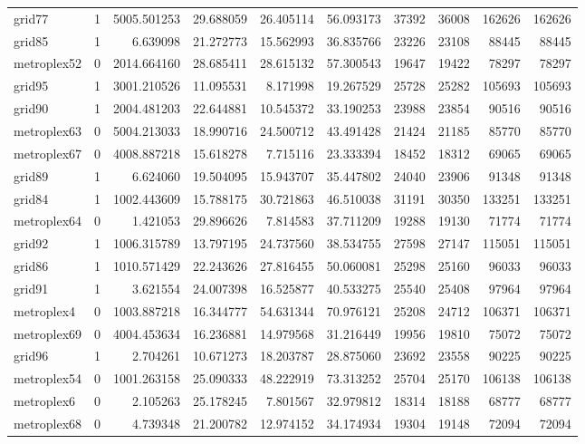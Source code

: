 \begin{longtable}{|l|r|r|r|r|r|r|r|r|r|}
grid77 & 1 & 5005.501253 & 29.688059 & 26.405114 & 56.093173 & 37392 & 36008 & 162626 & 162626 \\
grid85 & 1 & 6.639098 & 21.272773 & 15.562993 & 36.835766 & 23226 & 23108 & 88445 & 88445 \\
metroplex52 & 0 & 2014.664160 & 28.685411 & 28.615132 & 57.300543 & 19647 & 19422 & 78297 & 78297 \\
grid95 & 1 & 3001.210526 & 11.095531 & 8.171998 & 19.267529 & 25728 & 25282 & 105693 & 105693 \\
grid90 & 1 & 2004.481203 & 22.644881 & 10.545372 & 33.190253 & 23988 & 23854 & 90516 & 90516 \\
metroplex63 & 0 & 5004.213033 & 18.990716 & 24.500712 & 43.491428 & 21424 & 21185 & 85770 & 85770 \\
metroplex67 & 0 & 4008.887218 & 15.618278 & 7.715116 & 23.333394 & 18452 & 18312 & 69065 & 69065 \\
grid89 & 1 & 6.624060 & 19.504095 & 15.943707 & 35.447802 & 24040 & 23906 & 91348 & 91348 \\
grid84 & 1 & 1002.443609 & 15.788175 & 30.721863 & 46.510038 & 31191 & 30350 & 133251 & 133251 \\
metroplex64 & 0 & 1.421053 & 29.896626 & 7.814583 & 37.711209 & 19288 & 19130 & 71774 & 71774 \\
grid92 & 1 & 1006.315789 & 13.797195 & 24.737560 & 38.534755 & 27598 & 27147 & 115051 & 115051 \\
grid86 & 1 & 1010.571429 & 22.243626 & 27.816455 & 50.060081 & 25298 & 25160 & 96033 & 96033 \\
grid91 & 1 & 3.621554 & 24.007398 & 16.525877 & 40.533275 & 25540 & 25408 & 97964 & 97964 \\
metroplex4 & 0 & 1003.887218 & 16.344777 & 54.631344 & 70.976121 & 25208 & 24712 & 106371 & 106371 \\
metroplex69 & 0 & 4004.453634 & 16.236881 & 14.979568 & 31.216449 & 19956 & 19810 & 75072 & 75072 \\
grid96 & 1 & 2.704261 & 10.671273 & 18.203787 & 28.875060 & 23692 & 23558 & 90225 & 90225 \\
metroplex54 & 0 & 1001.263158 & 25.090333 & 48.222919 & 73.313252 & 25704 & 25170 & 106138 & 106138 \\
metroplex6 & 0 & 2.105263 & 25.178245 & 7.801567 & 32.979812 & 18314 & 18188 & 68777 & 68777 \\
metroplex68 & 0 & 4.739348 & 21.200782 & 12.974152 & 34.174934 & 19304 & 19148 & 72094 & 72094 \\

\end{longtable}
